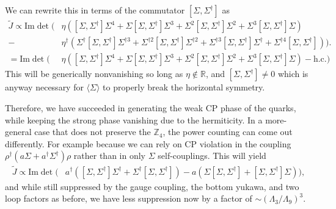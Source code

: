 \documentclass[11pt,a4paper]{article}
\begin{document}
%
We can rewrite this in terms of the commutator 
$\left[\Sigma,\Sigma^\dagger\right]$ as
%
\begin{align}
    \tilde{J} \propto \text{Im} \det \bigg( &\eta \left( \left[\Sigma,\Sigma^\dagger\right] \Sigma^4 + \Sigma \left[\Sigma,\Sigma^\dagger\right] \Sigma^3 + \Sigma^2 \left[\Sigma,\Sigma^\dagger\right] \Sigma^2 + \Sigma^3 \left[\Sigma,\Sigma^\dagger\right] \Sigma \right) \\
     - & \eta^\dagger \left( \Sigma^{\dagger} \left[\Sigma,\Sigma^\dagger\right] \Sigma^{\dagger 3} + \Sigma^{\dagger 2} \left[\Sigma,\Sigma^\dagger\right] \Sigma^{\dagger 2} + \Sigma^{\dagger 3} 
 \left[\Sigma,\Sigma^\dagger\right] \Sigma^{\dagger} + \Sigma^{\dagger 4} \left[\Sigma,\Sigma^\dagger\right] \right) \bigg). \nonumber \\
 = \text{Im} \det \bigg( &\eta \left( \left[\Sigma,\Sigma^\dagger\right] \Sigma^4 + \Sigma \left[\Sigma,\Sigma^\dagger\right] \Sigma^3 + \Sigma^2 \left[\Sigma,\Sigma^\dagger\right] \Sigma^2 + \Sigma^3 \left[\Sigma,\Sigma^\dagger\right] \Sigma \right) - \text{h.c.} \bigg) \nonumber
\end{align}
This will be generically nonvanishing so long as $\eta \notin \mathbb{R}$, and $\left[\Sigma,\Sigma^\dagger\right] \neq 0$ which is anyway necessary for $\langle \Sigma \rangle$ to properly break the horizontal symmetry.

Therefore, we have succeeded in generating the weak CP phase of the quarks, while keeping the strong phase vanishing due to the hermiticity. In a more-general case that does not preserve the $\mathbb{Z}_4$, the power counting can come out differently. For example because we can rely on CP violation in the coupling $\rho^\dagger ( a \Sigma + a^\dagger \Sigma^\dagger) \rho$ rather than in only $\Sigma$ self-couplings. This will yield
%
\begin{align}
    \tilde{J} \propto \text{Im} \det \bigg( &a^\dagger \left( \left[\Sigma,\Sigma^\dagger\right] \Sigma^\dagger + \Sigma^\dagger \left[\Sigma,\Sigma^\dagger\right] \right) 
    - a \left( \Sigma \left[\Sigma,\Sigma^\dagger\right] + \left[\Sigma,\Sigma^\dagger\right] \Sigma \right) \bigg),
\end{align}
%
and while still suppressed by the gauge coupling, the bottom yukawa, and two loop factors as before, we have less suppression now by a factor of $\sim (\Lambda_3/\Lambda_9)^3$.
\end{document}

